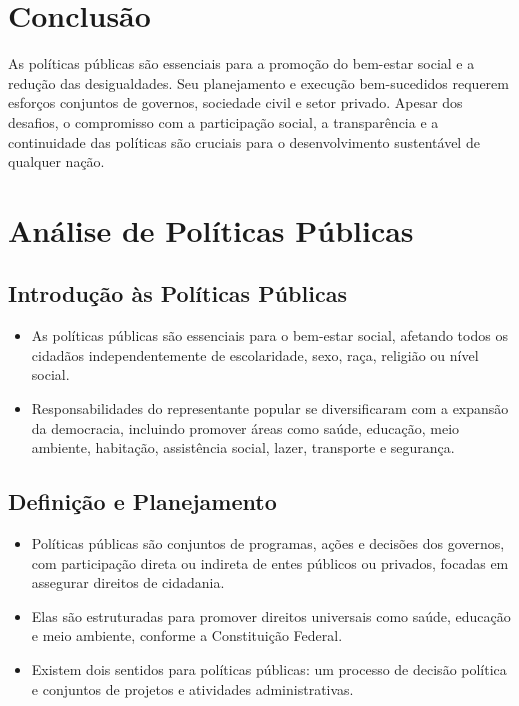 \documentclass[
   article,       
   12pt,          
   oneside,       
   a4paper,       
   english,       
   brazil,        
   sumario=tradicional
   ]{abntex2}
\begin{document}
\section{Conclusão}

As políticas públicas são essenciais para a promoção do bem-estar social e a redução das desigualdades. Seu planejamento e execução bem-sucedidos requerem esforços conjuntos de governos, sociedade civil e setor privado. Apesar dos desafios, o compromisso com a participação social, a transparência e a continuidade das políticas são cruciais para o desenvolvimento sustentável de qualquer nação.
\section{Análise de Políticas Públicas}
\subsection{Introdução às Políticas Públicas}
\begin{itemize}
    \item As políticas públicas são essenciais para o bem-estar social, afetando todos os cidadãos independentemente de escolaridade, sexo, raça, religião ou nível social. 
    \item Responsabilidades do representante popular se diversificaram com a expansão da democracia, incluindo promover áreas como saúde, educação, meio ambiente, habitação, assistência social, lazer, transporte e segurança.
\end{itemize}

\subsection{Definição e Planejamento}
\begin{itemize}
    \item Políticas públicas são conjuntos de programas, ações e decisões dos governos, com participação direta ou indireta de entes públicos ou privados, focadas em assegurar direitos de cidadania.
    \item Elas são estruturadas para promover direitos universais como saúde, educação e meio ambiente, conforme a Constituição Federal.
    \item Existem dois sentidos para políticas públicas: um processo de decisão política e conjuntos de projetos e atividades administrativas.
\end{itemize}
\end{document}
